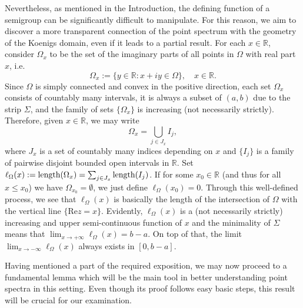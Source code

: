 \documentclass[11pt]{amsart}
\numberwithin{equation}{section}
\theoremstyle{definition}
\begin{document}
	Nevertheless, as mentioned in the Introduction, the defining function of a semigroup can be significantly difficult to manipulate. For this reason, we aim to discover a more transparent connection of the point spectrum with the geometry of the Koenigs domain, even if it leads to a partial result. For each $x\in\mathbb{R}$, consider $\Omega_x$ to be the set of the imaginary parts of all points in $\Omega$ with real part $x$, i.e.
	$$\Omega_x:=\{y\in\mathbb{R}:x+iy\in\Omega\}, \quad x\in\mathbb{R}.$$
	Since $\Omega$ is simply connected and convex in the positive direction, each set $\Omega_x$ consists of countably many intervals, it is always a subset of $(a,b)$ due to the strip $\Sigma$, and the family of sets $\{\Omega_x\}$ is increasing (not necessarily strictly). Therefore, given $x\in\mathbb{R}$, we may write 
	$$\Omega_x=\bigcup\limits_{j\in J_x}I_j,$$
	where $J_x$ is a set of countably many indices depending on $x$ and $\{I_j\}$ is a family of pairwise disjoint bounded open intervals in $\mathbb{R}$. Set $\ell_\Omega(x):=\textup{length}(\Omega_x)=\sum_{j\in J_x}\textup{length}(I_j)$. If for some $x_0\in\mathbb{R}$ (and thus for all $x\le x_0$) we have $\Omega_{x_0}=\emptyset$, we just define $\ell_\Omega(x_0)=0$. Through this well-defined process, we see that $\ell_\Omega(x)$ is basically the length of the intersection of $\Omega$ with the vertical line $\{\mathrm{Re}z=x\}$. Evidently, $\ell_\Omega(x)$ is a (not necessarily strictly) increasing and upper semi-continuous function of $x$ and the minimality of $\Sigma$ means that $\lim_{x\to+\infty}\ell_\Omega(x)=b-a$. On top of that, the limit $\lim_{x\to-\infty}\ell_\Omega(x)$ always exists in $[0,b-a]$.
	
	Having mentioned a part of the required exposition, we may now proceed to a fundamental lemma which will be the main tool in better understanding point spectra in this setting. Even though its proof follows easy basic steps, this result will be crucial for our examination.
	
\end{document}
